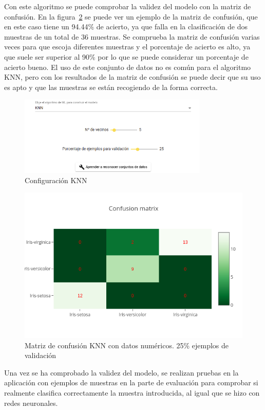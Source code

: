 \documentclass[a4paper, 12pt]{book}
\begin{document}
Con este algoritmo se puede comprobar la validez del modelo con la matriz de confusión. En la figura~\ref{fig:ejemplo12} se puede ver un ejemplo de la matriz de confusión, que en este caso tiene un 94.44\% de acierto, ya que falla en la clasificación de dos muestras de un total de 36 muestras. Se comprueba la matriz de confusión varias veces para que escoja diferentes muestras y el porcentaje de acierto es alto, ya que suele ser superior al 90\% por lo que se puede considerar un porcentaje de acierto bueno. El uso de este conjunto de datos no es común para el algoritmo KNN, pero con los resultados de la matriz de confusión se puede decir que su uso es apto y que las muestras se están recogiendo de la forma correcta.

\begin{figure}
	\centering
	\includegraphics[width=9cm, keepaspectratio]{img/ej_num_knn.png}
	\caption{Configuración KNN} 	\label{fig:ejemplo11}
\end{figure}

\begin{figure}
	\centering
	\includegraphics[width=12cm, keepaspectratio]{img/cm_num_knn.png}
	\caption{Matriz de confusión KNN con datos numéricos. 25\% ejemplos de validación} 	
	\label{fig:ejemplo12}
\end{figure}

Una vez se ha comprobado la validez del modelo, se realizan pruebas en la aplicación con ejemplos de muestras en la parte de evaluación para comprobar si realmente clasifica correctamente la muestra introducida, al igual que se hizo con redes neuronales.
\end{document}
